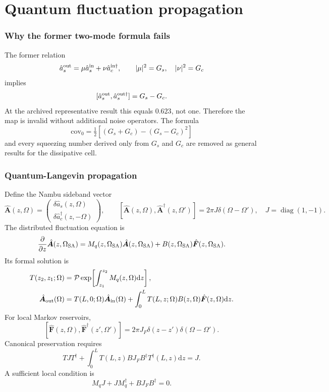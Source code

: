 \documentclass[11pt,a4paper]{article}
\newcommand{\dd}{\mathrm d}
\begin{document}
\part{Quantum fluctuation propagation}

\section{Why the former two-mode formula fails}

The former relation
\[
\hat a_s^{\rm out}=\mu\hat a_s^{\rm in}
+\nu\hat a_c^{{\rm in}\dagger},\qquad
|\mu|^2=G_s,\quad|\nu|^2=G_c
\]
implies
\[
[\hat a_s^{\rm out},\hat a_s^{{\rm out}\dagger}]
=G_s-G_c .
\]
At the archived representative result this equals $0.623$, not one. Therefore
the map is invalid without additional noise operators. The formula
\[
\mathrm{cov}_0=\tfrac12[(G_s+G_c)-(G_s-G_c)^2]
\]
and every squeezing number derived only from $G_s$ and $G_c$ are removed as
general results for the dissipative cell.

\section{Quantum-Langevin propagation}

Define the Nambu sideband vector
\begin{equation}
\hat{\bm A}(z,\Omega)=
\begin{pmatrix}
\delta\hat a_s(z,\Omega)\\
\delta\hat a_c^\dagger(z,-\Omega)
\end{pmatrix},\qquad
[\hat{\bm A}(z,\Omega),\hat{\bm A}^\dagger(z,\Omega')]
=2\pi J\delta(\Omega-\Omega'),
\quad J=\operatorname{diag}(1,-1).
\label{eq:nambu}
\end{equation}
The distributed fluctuation equation is
\begin{equation}
\frac{\partial}{\partial z}\hat{\bm A}(z,\Omega_{\rm SA})
=M_q(z,\Omega_{\rm SA})\hat{\bm A}(z,\Omega_{\rm SA})
+B(z,\Omega_{\rm SA})\hat{\bm F}(z,\Omega_{\rm SA}).
\label{eq:langevin}
\end{equation}
Its formal solution is
\begin{align}
T(z_2,z_1;\Omega)&=
\mathcal P\exp\!\left[\int_{z_1}^{z_2}M_q(z,\Omega)\dd z\right],\\
\hat{\bm A}_{\rm out}(\Omega)&=
T(L,0;\Omega)\hat{\bm A}_{\rm in}(\Omega)
+\int_0^L T(L,z;\Omega)B(z,\Omega)\hat{\bm F}(z,\Omega)\dd z .
\label{eq:langevin-solution}
\end{align}
For local Markov reservoirs,
\[
[\hat{\bm F}(z,\Omega),\hat{\bm F}^\dagger(z',\Omega')]
=2\pi J_F\delta(z-z')\delta(\Omega-\Omega').
\]
Canonical preservation requires
\begin{equation}
\boxed{\;
TJT^\dagger+\int_0^L
T(L,z)BJ_FB^\dagger T^\dagger(L,z)\dd z=J .\;}
\label{eq:commutator-integral}
\end{equation}
A sufficient local condition is
\begin{equation}
\boxed{\;
M_qJ+JM_q^\dagger+BJ_FB^\dagger=0 .\;}
\label{eq:physical-realizability}
\end{equation}
\end{document}
